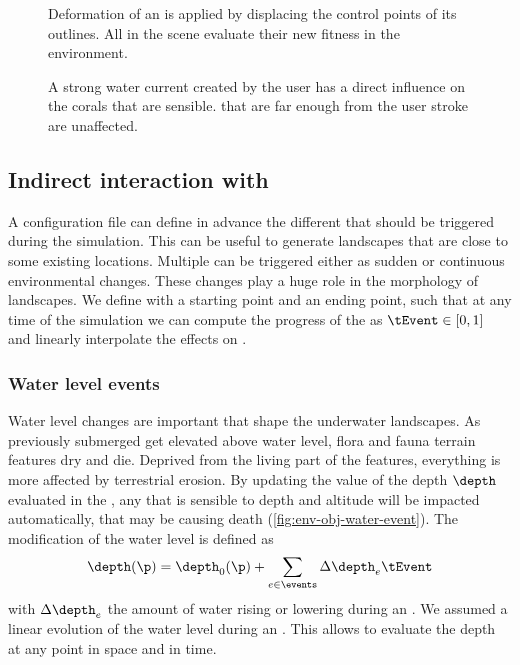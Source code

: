 \begin{figure}
    \caption{Deformation of an  is applied by displacing the control points of its outlines. All  in the scene evaluate their new fitness in the environment. }
    \label{fig:env-obj-island-deformation}
\end{figure}


\begin{figure}
    \caption{A strong water current created by the user has a direct influence on the corals that are sensible.  that are far enough from the user stroke are unaffected. }
    \label{fig:env-obj-user-flow-effects}
\end{figure}

\subsection{Indirect interaction with }
\label{sec:env-obj-events}
A configuration file can define in advance the different  that should be triggered during the simulation. This can be useful to generate landscapes that are close to some existing locations. 
Multiple  can be triggered either as sudden or continuous environmental changes. These changes play a huge role in the morphology of landscapes.
We define  with a starting point and an ending point, such that at any time of the simulation we can compute the progress of the  as $\tEvent \in [0, 1]$ and linearly interpolate the effects on .

\subsubsection{Water level events}
Water level changes are important  that shape the underwater landscapes. As previously submerged  get elevated above water level, flora and fauna terrain features dry and die. Deprived from the living part of the features, everything is more affected by terrestrial erosion. By updating the value of the depth $\depth$ evaluated in the , any  that is sensible to depth and altitude will be impacted automatically, that may be causing death (\cref{fig:env-obj-water-event}). The modification of the water level is defined as 
\begin{align}
    \depth(\p) = \depth_0(\p) + \sum_{e \in \events} \Delta \depth_e \tEvent
\end{align}
with $\Delta \depth_e$ the amount of water rising or lowering during an . We assumed a linear evolution of the water level during an . This allows to evaluate the depth at any point in space and in time.

